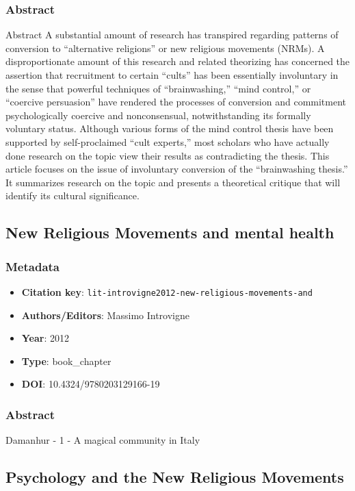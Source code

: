 \subsubsection*{Abstract}
Abstract A substantial amount of research has transpired regarding patterns of conversion to “alternative religions” or new religious movements (NRMs). A disproportionate amount of this research and related theorizing has concerned the assertion that recruitment to certain “cults” has been essentially involuntary in the sense that powerful techniques of “brainwashing,” “mind control,” or “coercive persuasion” have rendered the processes of conversion and commitment psychologically coercive and nonconsensual, notwithstanding its formally voluntary status. Although various forms of the mind control thesis have been supported by self-proclaimed “cult experts,” most scholars who have actually done research on the topic view their results as contradicting the thesis. This article focuses on the issue of involuntary conversion of the “brainwashing thesis.” It summarizes research on the topic and presents a theoretical critique that will identify its cultural significance.

\subsection{New Religious Movements and mental health}\label{lit:lit-introvigne2012-new-religious-movements-and}
\subsubsection*{Metadata}
\begin{itemize}
  \item \textbf{Citation key}: \texttt{lit-introvigne2012-new-religious-movements-and}
  \item \textbf{Authors/Editors}: Massimo Introvigne
  \item \textbf{Year}: 2012
  \item \textbf{Type}: book\_chapter
  \item \textbf{DOI}: 10.4324/9780203129166-19
\end{itemize}
\subsubsection*{Abstract}
Damanhur - 1 - A magical community in Italy

\subsection{Psychology and the New Religious Movements}\label{lit:lit-saliba2009-psychology-and-the-new}
